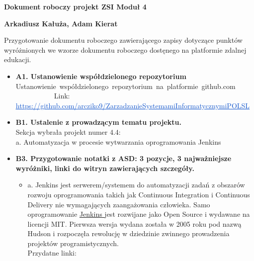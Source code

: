 \documentclass[12pt]{article}
\renewcommand{\_}{\kern-1.5pt\textunderscore\kern-1.5pt}
\begin{document}
\textbf{Dokument roboczy projekt ZSI Moduł 4}\par


\vspace{\baselineskip}
\textbf{Arkadiusz Kałuża, Adam Kierat}\par


\vspace{\baselineskip}
Przygotowanie dokumentu roboczego zawierającego zapisy dotyczące punktów wyróżnionych we wzorze dokumentu roboczego dostęnego na platformie zdalnej edukacji.\par


\vspace{\baselineskip}
\begin{itemize}
	\item \textbf{A1. Ustanowienie współdzielonego repozytorium}\\
Ustanowienie\ współdzielonego\ repozytorium\ na\ platformie\ github.com\ \ \ \ \ \ \ \ \ \ \ \ \ \ \ \       Link: \href{https://github.com/arcziko9/ZarzadzanieSystemamiInformatycznymiPOLSL}{\textcolor[HTML]{1155CC}{\ul{https://github.com/arcziko9/ZarzadzanieSystemamiInformatycznymiPOLSL}}}\\
\par

	\item \textbf{B1. Ustalenie z prowadzącym tematu projektu.}\\
Sekcja wybrała projekt numer 4.4:\\
 \tab a. Automatyzacja w procesie wytwarzania oprogramowania Jenkins\par

	\item \textbf{B3. Przygotowanie notatki z ASD: 3 pozycje, 3 najważniejsze wyróżniki, linki do witryn zawierających szczegóły.}\par

\begin{itemize}
	\item a. Jenkins jest serwerem/systemem do automatyzacji zadań z obszarów rozwoju oprogramowania takich jak Continuous Integration i Continuous Delivery nie wymagających zaangażowania człowieka. Samo oprogramowanie \href{https://www.exanet.pl/jenkins/}{Jenkins }jest rozwijane jako Open Source i wydawane na licencji MIT. Pierwsza wersja wydana została w 2005 roku pod nazwą Hudson i rozpoczęła rewolucję w dziedzinie zwinnego prowadzenia projektów programistycznych.\\
Przydatne linki:\par


\end{itemize}
\end{itemize}
\end{document}
